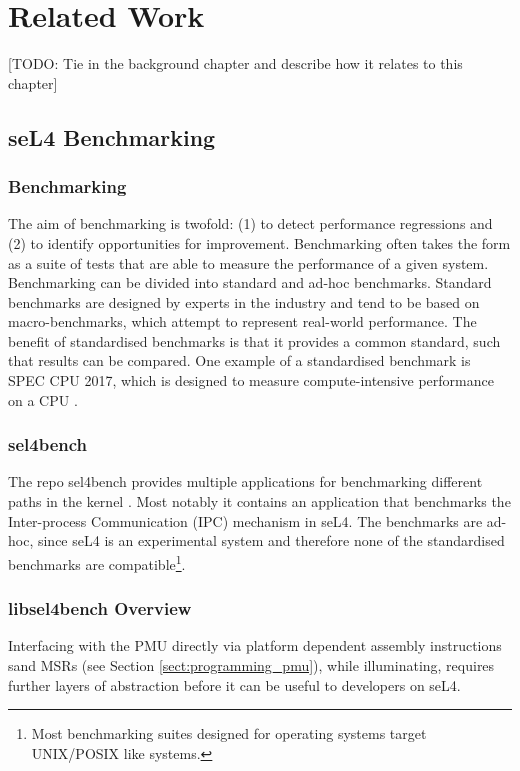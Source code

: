 \chapter{Related Work}\label{ch:relatedwork}

[TODO: Tie in the background chapter and describe how it relates to this chapter]

\section{seL4 Benchmarking}

\subsection{Benchmarking}

The aim of benchmarking is twofold: (1) to detect performance regressions and (2) to identify opportunities for improvement. Benchmarking often takes the form as a suite of tests that are able to measure the performance of a given system. Benchmarking can be divided into standard and ad-hoc benchmarks. Standard benchmarks are designed by experts in the industry and tend to be based on macro-benchmarks, which attempt to represent real-world performance. The benefit of standardised benchmarks is that it provides a common standard, such that results can be compared. One example of a standardised benchmark is SPEC CPU 2017, which is designed to measure compute-intensive performance on a CPU \cite{SPECCPU2017}.

\subsection{sel4bench}

The repo sel4bench provides multiple applications for benchmarking different paths in the kernel \cite{GithubSel4bench}. Most notably it contains an application that benchmarks the Inter-process Communication (IPC) mechanism in seL4. The benchmarks are ad-hoc, since seL4 is an experimental system and therefore none of the standardised benchmarks are compatible\footnote{Most benchmarking suites designed for operating systems target UNIX/POSIX like systems.}.

\subsection{libsel4bench Overview}

Interfacing with the PMU directly via platform dependent assembly instructions sand MSRs (see Section \ref{sect:programming_pmu}), while illuminating, requires further layers of abstraction before it can be useful to developers on seL4. 

